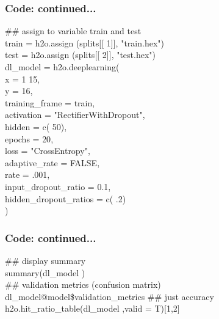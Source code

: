 \documentclass{beamer}
\begin{document}
\begin{frame}
\frametitle{Code: continued...}
{\color{applegreen}  \#\# assign to variable train and test } \\
train = h2o.assign (splits[[ {\color{blue} 1}]], "train.hex") \\
test  = h2o.assign (splits[[{\color{blue}  2}]], "test.hex")     \\
dl\_model = h2o.deeplearning(  \\
\hspace{0.5cm}    x = {\color{blue} 1} {\color{blue} 15},  \\
\hspace{0.5cm}    y = {\color{blue} 16},  \\
\hspace{0.5cm}    training\_frame = train,  \\
\hspace{0.5cm}    activation = "RectifierWithDropout", \\
\hspace{0.5cm}    hidden = c({\color{blue} 50}), \\
\hspace{0.5cm}    epochs = {\color{blue} 20}, \\
\hspace{0.5cm}    loss = "CrossEntropy", \\
\hspace{0.5cm}    adaptive\_rate = FALSE, \\
\hspace{0.5cm}    rate ={\color{blue} .001}, \\
\hspace{0.5cm}    input\_dropout\_ratio = {\color{blue} 0.1}, \\
\hspace{0.5cm}    hidden\_dropout\_ratios = c({\color{blue} .2}) \\
)
\end{frame}

\begin{frame}
\frametitle{Code: continued...}
{\color{applegreen}  \#\# display summary } \\
summary(dl\_model ) \\
{\color{applegreen}  \#\# validation metrics (confusion matrix)} \\
dl\_model@model\$validation\_metrics     
{\color{applegreen}  \#\# just accuracy } \\
h2o.hit\_ratio\_table(dl\_model ,valid = T)[1,2] \\
\end{frame}
\end{document}
